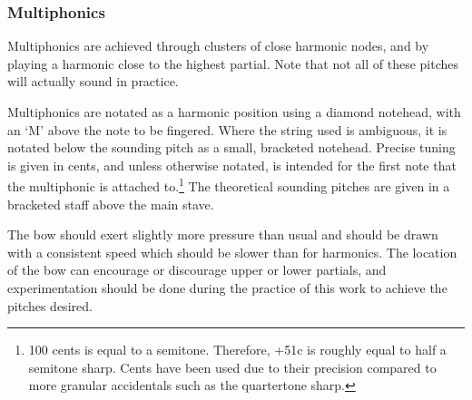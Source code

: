 \subsubsection*{Multiphonics}
Multiphonics are achieved through clusters of close harmonic nodes, and by playing a harmonic close to the highest partial.
  Note that not all of these pitches will actually sound in practice.
  
  Multiphonics are notated as a harmonic position using a diamond notehead, with an `M' above the note to be fingered.
  Where the string used is ambiguous, it is notated below the sounding pitch as a small, bracketed notehead.
  Precise tuning is given in cents, and unless otherwise notated, is intended for the first note that the multiphonic is attached to.\footnote{100 cents is equal to a semitone. Therefore, +51c is roughly equal to half a semitone sharp. Cents have been used due to their precision compared to more granular accidentals such as the quartertone sharp.}
  The theoretical sounding pitches are given in a bracketed staff above the main stave.

  The bow should exert slightly more pressure than usual and should be drawn with a consistent speed which should be slower than for harmonics.
  The location of the bow can encourage or discourage upper or lower partials, and experimentation should be done during the practice of this work to achieve the pitches desired.

